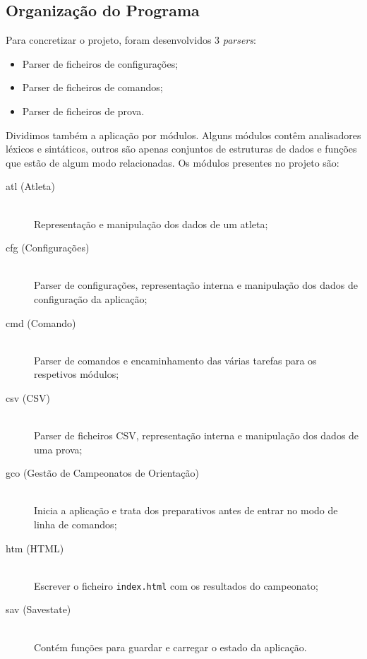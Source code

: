\documentclass[11pt, a4paper, oneside]{article}
\begin{document}
\newpage
\subsection{Organização do Programa}

Para concretizar o projeto, foram desenvolvidos 3 \emph{parsers}:
\begin{itemize}
\item Parser de ficheiros de configurações;
\item Parser de ficheiros de comandos;
\item Parser de ficheiros de prova.
\end{itemize}

Dividimos também a aplicação por módulos. Alguns módulos contêm analisadores léxicos e sintáticos, outros são apenas conjuntos de estruturas de dados e funções que estão de algum modo relacionadas. Os módulos presentes no projeto são:
\begin{description}
\item[atl (Atleta)] \hfill \\
	Representação e manipulação dos dados de um atleta;
	
\item[cfg (Configurações)] \hfill \\
	Parser de configurações, representação interna e manipulação dos dados de configuração da aplicação;

\item[cmd (Comando)] \hfill \\
	Parser de comandos e encaminhamento das várias tarefas para os respetivos módulos;

\item[csv (CSV)] \hfill \\
	Parser de ficheiros CSV, representação interna e manipulação dos dados de uma prova;

\item[gco (Gestão de Campeonatos de Orientação)] \hfill \\
	Inicia a aplicação e trata dos preparativos antes de entrar no modo de linha de comandos;
	
\item[htm (HTML)] \hfill \\
	Escrever o ficheiro \texttt{index.html} com os resultados do campeonato;
	
\item[sav (Savestate)] \hfill \\
	Contém funções para guardar e carregar o estado da aplicação.
\end{description}
\end{document}
